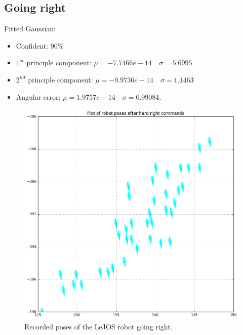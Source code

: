\documentclass[paper=a4, fontsize=11pt]{scrartcl} %
\begin{document}
    \subsection{Going right}
	 Fitted Gaussian:
	 \begin{itemize}
	    \item Confident: 90\%
	  	\item $1^{st}$ principle component: $\mu = -7.7466e-14 \quad \sigma = 5.6995$
	  	\item $2^{nd}$ principle component: $\mu = -9.9736e-14 \quad \sigma = 1.1463$
	  	\item Angular error: $\mu = 1.9757e-14 \quad \sigma = 0.99084$.
	 \end{itemize}
    \begin{figure}[h!]
        \begin{center}
            \setlength{\fboxsep}{0.5pt} %
            \setlength{\fboxrule}{0.5pt}
            \includegraphics[width=12cm,fbox]{images/poses_plot_5_right.png}
            \caption{Recorded poses of the LeJOS robot going right.}
        \end{center}
    \end{figure}
\end{document}
